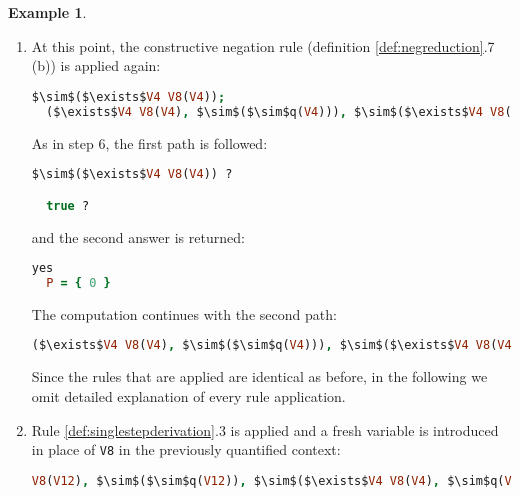 \documentclass[inscr,ack,preface]{dithesis}
\theoremstyle{definition}
\newtheorem{example}{Example}[chapter]
\newcommand{\msf}[1]{$\mathsf{#1}$}
\begin{document}
\begin{example}
\begin{enumerate}
There is one important observation to make at this point. The above goal list is exactly the same as the goal list in step 4, except for one difference: instead of predicate variable \texttt{P} we now have \texttt{V8}.

Recall that, from step 10, predicate variable \texttt{P} is bound to \texttt{($\lambda$X.(X=V5) $\bigvee_{\kappa}$ V8)} and, from step 13, variable \texttt{V5} is bound to \texttt{0}. Therefore, \texttt{P = 0 $\bigvee_{\kappa}$ V8}.

This should give more clear view of how the extended constructive negation rule for higher-order predicates works. Higher-order variable \texttt{V8} occured from step 9 and acts as the ``tail'' of \texttt{P}. However, should the rule not contain the \msf{\dots \land B} part, it would never have a chance to be computed.

\item At this point, the constructive negation rule (definition \ref{def:negreduction}.7 (b)) is applied again:
\begin{lstlisting}[language=Prolog,%
  frame=single,breaklines=false,mathescape=true]
  $\sim$($\exists$V4 V8(V4));
  ($\exists$V4 V8(V4), $\sim$($\sim$q(V4))), $\sim$($\exists$V4 V8(V4), $\sim$q(V4)) ?
\end{lstlisting}

As in step 6, the first path is followed:
\begin{lstlisting}[language=Prolog,%
  frame=single,breaklines=false,mathescape=true]
  $\sim$($\exists$V4 V8(V4)) ?

  true ?
\end{lstlisting}

and the second answer is returned:
\begin{lstlisting}[language=Prolog,%
  frame=single,breaklines=false,mathescape=true]
  yes
  P = { 0 }
\end{lstlisting}

The computation continues with the second path:
\begin{lstlisting}[language=Prolog,%
  frame=single,breaklines=false,mathescape=true]
  ($\exists$V4 V8(V4), $\sim$($\sim$q(V4))), $\sim$($\exists$V4 V8(V4), $\sim$q(V4)) ?
\end{lstlisting}

Since the rules that are applied are identical as before, in the following we omit detailed explanation of every rule application.

\item Rule \ref{def:singlestepderivation}.3 is applied and a fresh variable is introduced in place of \texttt{V8} in the previously quantified context:
\begin{lstlisting}[language=Prolog,%
  frame=single,breaklines=false,mathescape=true]
  V8(V12), $\sim$($\sim$q(V12)), $\sim$($\exists$V4 V8(V4), $\sim$q(V4)) ?
\end{lstlisting}


\end{enumerate}
\end{example}
\end{document}
